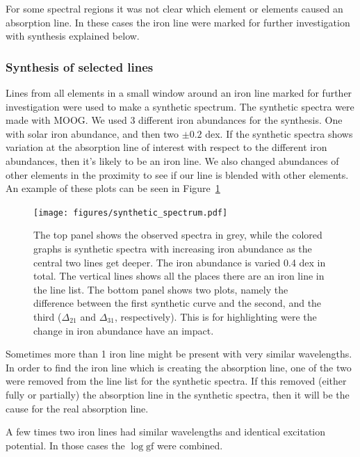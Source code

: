 \documentclass{aa}
\begin{document}
For some spectral regions it was not clear which element or elements
caused an absorption line. In these cases the iron line were marked for
further investigation with synthesis explained below.



\subsubsection{Synthesis of selected lines}
\label{sub:synthesis_of_selected_lines}
Lines from all elements in a small window around an iron line marked
for further investigation were used to make a synthetic spectrum.
The synthetic spectra were made with MOOG. We used 3 different iron
abundances for the synthesis. One with solar iron abundance, and
then two $\pm0.2$ dex. If the synthetic spectra shows variation at
the absorption line of interest with respect to the different iron
abundances, then it's likely to be an iron line. We also changed
abundances of other elements in the proximity to see if our line is
blended with other elements. An example of these plots can be seen
in Figure~\ref{fig:synthesis}

\begin{figure}[htpb]
    \centering
    \texttt{[image: figures/synthetic\_spectrum.pdf]}
    \caption{The top panel shows the observed spectra in grey, while
        the colored graphs is synthetic spectra with increasing iron
        abundance as the central two lines get deeper. The iron abundance
        is varied 0.4 dex in total. The vertical lines shows all the places
        there are an iron line in the line list. The bottom panel shows
        two plots, namely the difference between the first synthetic curve
        and the second, and the third ($\Delta_{21}$ and $\Delta_{31}$,
        respectively). This is for highlighting were the change in iron
        abundance have an impact.}
    \label{fig:synthesis}
\end{figure}


Sometimes more than 1 iron line might be present with very similar
wavelengths. In order to find the iron line which is creating the
absorption line, one of the two were removed from the line list for
the synthetic spectra. If this removed (either fully or partially) the
absorption line in the synthetic spectra, then it will be the cause for
the real absorption line.

A few times two iron lines had similar wavelengths and identical
excitation potential. In those cases the $\log \mathrm{gf}$ were
combined.
\end{document}
